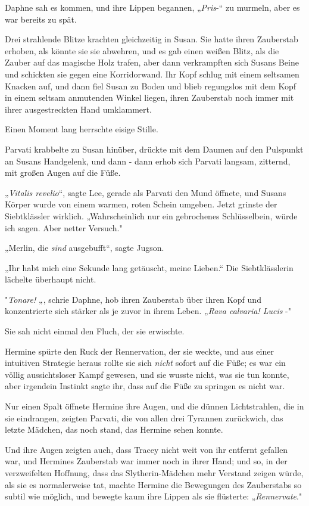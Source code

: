 {Daphne sah es kommen, und ihre Lippen begannen, „\emph{Pris}-“ zu murmeln, aber es war bereits zu spät.

Drei strahlende Blitze krachten gleichzeitig in Susan. Sie hatte ihren Zauberstab erhoben, als könnte sie sie abwehren, und es gab einen weißen Blitz, als die Zauber auf das magische Holz trafen, aber dann verkrampften sich Susans Beine und schickten sie gegen eine Korridorwand. Ihr Kopf schlug mit einem seltsamen Knacken auf, und dann fiel Susan zu Boden und blieb regungslos mit dem Kopf in einem seltsam anmutenden Winkel liegen, ihren Zauberstab noch immer mit ihrer ausgestreckten Hand umklammert.

Einen Moment lang herrschte eisige Stille.

Parvati krabbelte zu Susan hinüber, drückte mit dem Daumen auf den Pulspunkt an Susans Handgelenk, und dann - dann erhob sich Parvati langsam, zitternd, mit großen Augen auf die Füße.

„\emph{Vitalis revelio}“, sagte Lee, gerade als Parvati den Mund öffnete, und Susans Körper wurde von einem warmen, roten Schein umgeben. Jetzt grinste der Siebtklässler wirklich. „Wahrscheinlich nur ein gebrochenes Schlüsselbein, würde ich sagen. Aber netter Versuch."

„Merlin, die \emph{sind} ausgebufft“, sagte Jugson.

„Ihr habt mich eine Sekunde lang getäuscht, meine Lieben.“ Die Siebtklässlerin lächelte überhaupt nicht.

"\emph{Tonare!} „, schrie Daphne, hob ihren Zauberstab über ihren Kopf und konzentrierte sich stärker als je zuvor in ihrem Leben. „\emph{Rava calvaria! Lucis} -"

Sie sah nicht einmal den Fluch, der sie erwischte.

\hfill\break Hermine spürte den Ruck der Rennervation, der sie weckte, und aus einer intuitiven Strategie heraus rollte sie sich \emph{nicht} sofort auf die Füße; es war ein völlig aussichtsloser Kampf gewesen, und sie wusste nicht, was sie tun konnte, aber irgendein Instinkt sagte ihr, dass auf die Füße zu springen es nicht war.

Nur einen Spalt öffnete Hermine ihre Augen, und die dünnen Lichtstrahlen, die in sie eindrangen, zeigten Parvati, die von allen drei Tyrannen zurückwich, das letzte Mädchen, das noch stand, das Hermine sehen konnte.

Und ihre Augen zeigten auch, dass Tracey nicht weit von ihr entfernt gefallen war, und Hermines Zauberstab war immer noch in ihrer Hand; und so, in der verzweifelten Hoffnung, dass das Slytherin-Mädchen mehr Verstand zeigen würde, als sie es normalerweise tat, machte Hermine die Bewegungen des Zauberstabs so subtil wie möglich, und bewegte kaum ihre Lippen als sie flüsterte: „\emph{Rennervate}."

}
